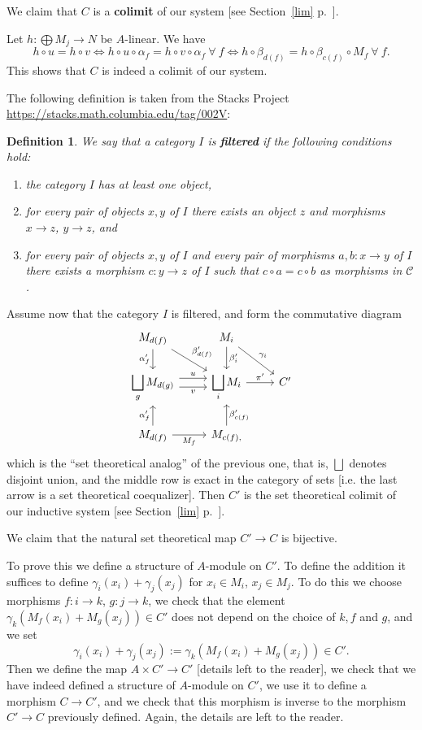 \documentclass[12pt,letterpaper]{article}%
\newcommand{\ds}{\displaystyle}
\newtheorem{df}[thm]{Definition}
\begin{document}
We claim that $C$ is a \textbf{colimit} of our system [see Section~\ref{lim} p.~\pageref{lim}].

Let $h:\bigoplus M_j\to N$ be $A$-linear. We have 
$$
h\circ u=h\circ v\iff h\circ u\circ\alpha_f=h\circ v\circ\alpha_f\ \forall\ f\iff h\circ\beta_{d(f)}=h\circ\beta_{c(f)}\circ M_f\ \forall\ f.
$$ 
This shows that $C$ is indeed a colimit of our system.

The following definition is taken from the Stacks Project\\ \href{https://stacks.math.columbia.edu/tag/002V}{https://stacks.math.columbia.edu/tag/002V}:

\begin{df}
We say that a category $I$ is \textbf{filtered} if the following conditions hold:
\begin{enumerate}
\item the category $I$ has at least one object,
\item for every pair of objects $x, y$ of $I$ there exists an object $z$ and morphisms $x \to z$, $y \to z$, and
\item for every pair of objects $x, y$ of $I$ and every pair of morphisms $a, b : x \to y$ of $I$ there exists a morphism $c : y \to z$ of $I$ such that $c \circ a=c\circ b$ as morphisms in $\mathcal{C}$.
\end{enumerate}
\end{df}

Assume now that the category $I$ is filtered, and form the commutative diagram 
$$
\begin{tikzcd}
M_{d(f)}\ar[d,"\alpha'_{f}"']\ar[dr,"\beta'_{d(f)}"]&M_i\ar[d,"\beta'_i"]\ar[dr,"\gamma_i"]\\ 
\ds\bigsqcup_gM_{d(g)}\ar[r,yshift=0.9ex,"u"]\ar[r,yshift=-0.9ex,"v"']&\ds\bigsqcup_iM_i\ar[r,"\pi'"]&C'\\ 
M_{d(f)}\ar[u,"\alpha'_{f}"]\ar[r,"M_f"']&M_{c(f),}\ar[u,"\beta'_{c(f)}"']
\end{tikzcd}
$$ 
which is the ``set theoretical analog'' of the previous one, that is, $\bigsqcup$ denotes disjoint union, and the middle row is exact in the category of sets [i.e. the last arrow is a set theoretical coequalizer]. Then $C'$ is the set theoretical colimit of our inductive system [see Section~\ref{lim} p.~\pageref{lim}]. 

We claim that the natural set theoretical map $C'\to C$ is bijective. 

To prove this we define a structure of $A$-module on $C'$. To define the addition it suffices to define $\gamma_i(x_i)+\gamma_j(x_j)$ for $x_i\in M_i$, $x_j\in M_j$. To do this we choose morphisms $f:i\to k$, $g:j\to k$, we check that the element $\gamma_k(M_f(x_i)+M_g(x_j))\in C'$ does not depend on the choice of $k,f$ and $g$, and we set 
$$
\gamma_i(x_i)+\gamma_j(x_j):=\gamma_k(M_f(x_i)+M_g(x_j))\in C'.
$$ 
Then we define the map $A\times C'\to C'$ [details left to the reader], we check that we have indeed defined a structure of $A$-module on $C'$, we use it to define a morphism $C\to C'$, and we check that this morphism is inverse to the morphism $C'\to C$ previously defined. Again, the details are left to the reader.%
\end{document}
